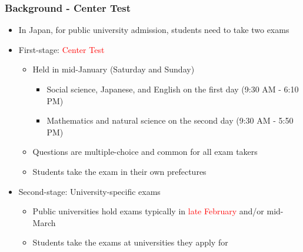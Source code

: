 \documentclass[10pt, pdfmx,hiresbb]{beamer}
\begin{document}
\begin{frame}\frametitle{Background - Center Test}
  \begin{itemize}
    \item In Japan, for public university admission, students need to take two exams
    \item First-stage: \textcolor{red}{Center Test}
      \begin{itemize}
        \item Held in mid-January (Saturday and Sunday)
          \begin{itemize}
            \item Social science, Japanese, and English on the first day (9:30 AM - 6:10 PM)
            \item Mathematics and natural science on the second day (9:30 AM - 5:50 PM)
          \end{itemize}
        \item Questions are multiple-choice and common for all exam takers
        \item Students take the exam in their own prefectures
      \end{itemize}
    \item Second-stage: University-specific exams
      \begin{itemize}
        \item Public universities hold exams typically in \textcolor{red}{late February} and/or mid-March
        \item Students take the exams at universities they apply for
      \end{itemize}
  \end{itemize}
\end{frame}
\end{document}
